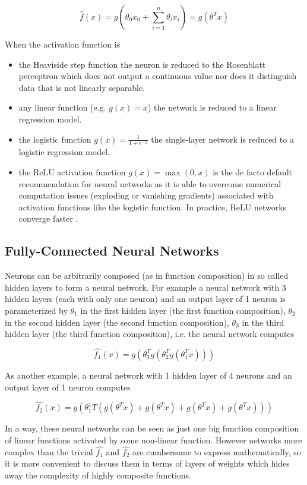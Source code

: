 $$
\hat{f}(x) = g(\theta_0 x_0 + \sum_{i=1}^{n}{\theta_i x_i}) = g(\theta^T x)
$$

When the activation function is

\begin{itemize}
    \item the Heaviside step function the neuron is reduced to the Rosenblatt perceptron which does not output a continuous value nor does it distinguish data that is not linearly separable.
    \item any linear function (e.g. $g(x) = x$) the network is reduced to a linear regression model.
    \item the logistic function $g(x) = \frac{1}{1 + e^{-x}}$ the single-layer network is reduced to a logistic regression model.
    \item the ReLU activation function $g(x) = \max(0, x)$ is the de facto default recommendation for neural networks as it is able to overcome numerical computation issues (exploding or vanishing gradients) associated with activation functions like the logistic function. In practice, ReLU networks converge faster \cite{alexnet}.
\end{itemize}

\subsection{Fully-Connected Neural Networks}

Neurons can be arbitrarily composed (as in function composition) in so called hidden layers to form a neural network. For example a neural network with 3 hidden layers (each with only one neuron) and an output layer of 1 neuron is parameterized by $\theta_1$ in the first hidden layer (the first function composition), $\theta_2$ in the second hidden layer (the second function composition), $\theta_3$ in the third hidden layer (the third function composition), i.e. the neural network computes

$$
\hat{f_1}(x) = g(\theta_3^T g(\theta_2^T g(\theta_1^T x)))
$$

As another example, a neural network with 1 hidden layer of 4 neurons and an output layer of 1 neuron computes

$$
\hat{f_2}(x) = g(\theta_1^1 T (g(\theta^T x) + g(\theta^T x) + g(\theta^T x) + g(\theta^T x)))
$$

In a way, these neural networks can be seen as just one big function composition of linear functions activated by some non-linear function. However networks more complex than the trivial $\hat{f_1}$ and $\hat{f_2}$ are cumbersome to express mathematically, so it is more convenient to discuss them in terms of layers of weights which hides away the complexity of highly composite functions.

